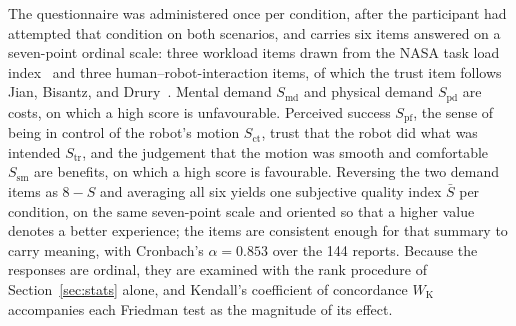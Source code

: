 \documentclass[12pt,a4paper,twoside,openright]{report}
\begin{document}
The questionnaire was administered once per condition, after the participant had attempted that condition on both scenarios, and carries six items answered on a seven-point ordinal scale: three workload items drawn from the NASA task load index~\cite{hart1988nasatlx} and three human--robot-interaction items, of which the trust item follows Jian, Bisantz, and Drury~\cite{jian2000trust}. Mental demand $S_{\mathrm{md}}$ and physical demand $S_{\mathrm{pd}}$ are costs, on which a high score is unfavourable. Perceived success $S_{\mathrm{pf}}$, the sense of being in control of the robot's motion $S_{\mathrm{ct}}$, trust that the robot did what was intended $S_{\mathrm{tr}}$, and the judgement that the motion was smooth and comfortable $S_{\mathrm{sm}}$ are benefits, on which a high score is favourable. Reversing the two demand items as $8-S$ and averaging all six yields one subjective quality index $\bar{S}$ per condition, on the same seven-point scale and oriented so that a higher value denotes a better experience; the items are consistent enough for that summary to carry meaning, with Cronbach's $\alpha = 0.853$ over the 144 reports. Because the responses are ordinal, they are examined with the rank procedure of Section~\ref{sec:stats} alone, and Kendall's coefficient of concordance $W_{\mathrm{K}}$ accompanies each Friedman test as the magnitude of its effect.
\end{document}
